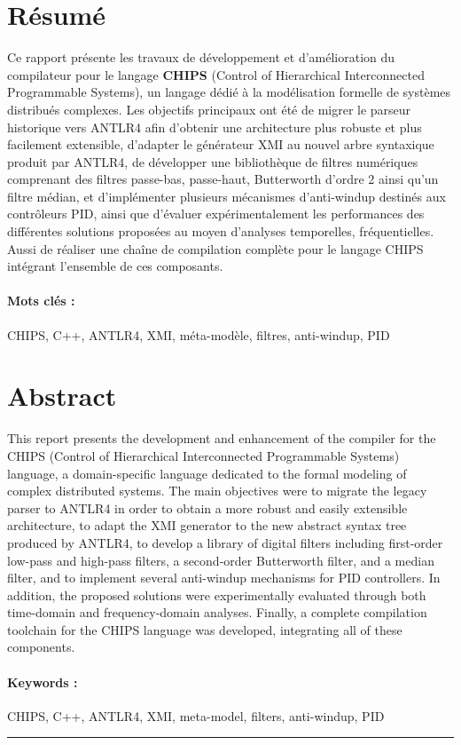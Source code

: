 \documentclass[a4paper, 11pt]{article}
\begin{document}
\section*{Résumé}

Ce rapport présente les travaux de développement et d'amélioration du compilateur pour le langage \textbf{CHIPS} 
(Control of Hierarchical Interconnected Programmable Systems), un langage dédié à la modélisation formelle de systèmes distribués complexes. 
Les objectifs principaux ont été de migrer le parseur historique vers ANTLR4 afin d'obtenir une architecture plus robuste et plus facilement 
extensible, d'adapter le générateur XMI au nouvel arbre syntaxique produit par ANTLR4, de développer une bibliothèque de filtres numériques 
comprenant des filtres passe-bas, passe-haut, Butterworth d'ordre 2 ainsi qu'un filtre médian, et d'implémenter plusieurs mécanismes d'anti-windup 
destinés aux contrôleurs PID, ainsi que d'évaluer expérimentalement les performances des différentes solutions proposées au moyen d'analyses 
temporelles, fréquentielles. Aussi de réaliser une chaîne de compilation complète pour le langage CHIPS intégrant l'ensemble de ces composants.

\paragraph{\textbf{Mots clés :}} CHIPS, C++, ANTLR4, XMI, méta-modèle, filtres, anti-windup, PID 
\vspace{1cm}

\section*{Abstract}

This report presents the development and enhancement of the compiler for the CHIPS (Control of Hierarchical Interconnected Programmable Systems) 
language, a domain-specific language dedicated to the formal modeling of complex distributed systems. The main objectives were to migrate the legacy 
parser to ANTLR4 in order to obtain a more robust and easily extensible architecture, to adapt the XMI generator to the new abstract syntax tree 
produced by ANTLR4, to develop a library of digital filters including first-order low-pass and high-pass filters, a second-order Butterworth filter, 
and a median filter, and to implement several anti-windup mechanisms for PID controllers. In addition, the proposed solutions were experimentally 
evaluated through both time-domain and frequency-domain analyses. Finally, a complete compilation toolchain for the CHIPS language was developed, 
integrating all of these components.

\paragraph{\textbf{Keywords :}} CHIPS, C++, ANTLR4, XMI, meta-model, filters, anti-windup, PID


\vspace{0.2cm}
\rule{\textwidth}{0.5pt}

\FloatBarrier


\clearpage
\end{document}

